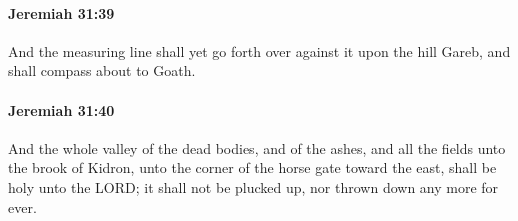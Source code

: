 		\paragraph{Jeremiah 31:39} %
			\label{JEREMIAH-31-39}

			And the measuring line shall yet go forth over against it upon the hill Gareb, and shall compass about to Goath.


		\paragraph{Jeremiah 31:40} %
			\label{JEREMIAH-31-40}

			And the whole valley of the dead bodies, and of the ashes, and all the fields unto the brook of Kidron, unto the corner of the horse gate toward the east, shall be holy unto the LORD; it shall not be plucked up, nor thrown down any more for ever.

